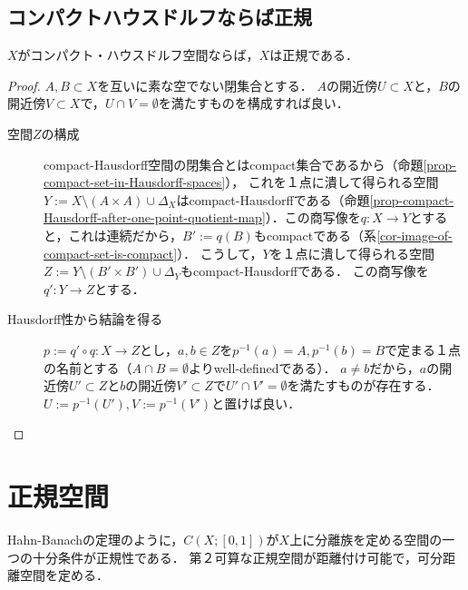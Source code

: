 \documentclass[uplatex,dvipdfmx]{jsreport}
\begin{document}
\subsection{コンパクトハウスドルフならば正規}

\begin{corollary}\label{cor-compact-Hausdorff-space-is-normal}
    $X$がコンパクト・ハウスドルフ空間ならば，$X$は正規である．
\end{corollary}
\begin{proof}
    $A,B\subset X$を互いに素な空でない閉集合とする．
    $A$の開近傍$U\subset X$と，$B$の開近傍$V\subset X$で，$U\cap V=\emptyset$を満たすものを構成すれば良い．
    \begin{description}
        \item[空間$Z$の構成] 
        compact-Hausdorff空間の閉集合とはcompact集合であるから（命題\ref{prop-compact-set-in-Hausdorff-spaces}），
        これを１点に潰して得られる空間$Y:=X\setminus(A\times A)\cup\Delta_X$はcompact-Hausdorffである（命題\ref{prop-compact-Hausdorff-after-one-point-quotient-map}）．この商写像を$q:X\to Y$とすると，これは連続だから，$B':=q(B)$もcompactである（系\ref{cor-image-of-compact-set-is-compact}）．
        こうして，$Y$を１点に潰して得られる空間$Z:=Y\setminus(B'\times B')\cup\Delta_Y$もcompact-Hausdorffである．
        この商写像を$q':Y\to Z$とする．
        \item[Hausdorff性から結論を得る]
        $p:=q'\circ q:X\to Z$とし，$a,b\in Z$を$p^{-1}(a)=A,p^{-1}(b)=B$で定まる１点の名前とする（$A\cap B=\emptyset$よりwell-definedである）．
        $a\ne b$だから，$a$の開近傍$U'\subset Z$と$b$の開近傍$V'\subset Z$で$U'\cap V'=\emptyset$を満たすものが存在する．
        $U:=p^{-1}(U'),V:=p^{-1}(V')$と置けば良い．
    \end{description}
\end{proof}

\section{正規空間}

\begin{tcolorbox}[colframe=ForestGreen, colback=ForestGreen!10!white,breakable,colbacktitle=ForestGreen!40!white,coltitle=black,fonttitle=\bfseries\sffamily,
title=]
    Hahn-Banachの定理のように，$C(X;[0,1])$が$X$上に分離族を定める空間の一つの十分条件が正規性である．
    第２可算な正規空間が距離付け可能で，可分距離空間を定める．
\end{tcolorbox}
\end{document}
